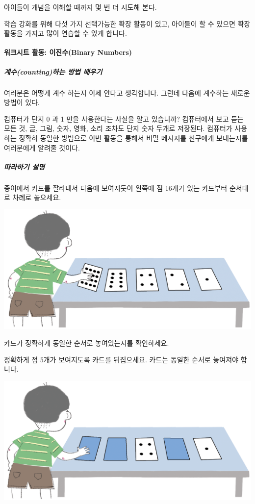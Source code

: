 \documentclass[]{article}
\begin{document}
아이들이 개념을 이해할 때까지 몇 번 더 시도해 본다.

학습 강화를 위해 다섯 가지 선택가능한 확장 활동이 있고, 아이들이 할 수
있으면 확장 활동을 가지고 많이 연습할 수 있게 합니다.

\mbox{}\paragraph{워크시트 활동: 이진수(Binary
Numbers)}\label{binary-numbers-1}

\subparagraph{계수(counting)하는 방법 배우기}\label{counting--}

여러분은 어떻게 계수 하는지 이제 안다고 생각합니다. 그런데 다음에
계수하는 새로운 방법이 있다.

컴퓨터가 단지 0 과 1 만을 사용한다는 사실을 알고 있습니까? 컴퓨터에서
보고 듣는 모든 것, 글, 그림, 숫자, 영화, 소리 조차도 단지 숫자 두개로
저장된다. 컴퓨터가 사용하는 정확히 동일한 방법으로 이번 활동을 통해서
비밀 메시지를 친구에게 보내는지를 여러분에게 알려줄 것이다.

\subparagraph{따라하기 설명}\label{section-11}

종이에서 카드를 잘라내서 다음에 보여지듯이 왼쪽에 점 16개가 있는
카드부터 순서대로 차례로 놓으세요.

\includegraphics{csunplugged/01-part/img/ch01-binary/01-binary-04-instruction_01.png}

카드가 정확하게 동일한 순서로 놓여있는지를 확인하세요.

정확하게 점 5개가 보여지도록 카드를 뒤집으세요. 카드는 동일한 순서로
놓여져야 합니다.

\includegraphics{csunplugged/01-part/img/ch01-binary/01-binary-04-instruction_02.png}
\end{document}
